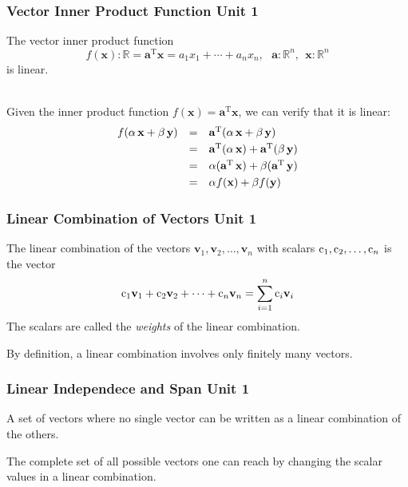 \documentclass[12pt]{beamer}
\newcommand{\FrameTitle}[2]{\frametitle{#1 \hfill \small\textnormal{\textcolor{midgray}{#2}}}}
\newcommand{\ThreePtVspace}{\vspace*{3pt}}
\newcommand{\vsp}{\vspace*{1em}}
\newcommand{\Vector}[1]{\textbf{#1}}
\newcommand{\Scalar}[1]{\textnormal{#1}}
\newcommand{\Quiz}[1]{{\Large\textbf{\color{question}{#1}}}}
\begin{document}
\begin{frame}\FrameTitle{Vector Inner Product Function}{Unit 1}
    The vector inner product function
    \[
        f(\Vector{x}):\mathbb{R} = \Vector{a}^{\textrm{T}} \Vector{x} = a_1x_1 + \cdots + a_nx_n, \ \ \  \Vector{a}: \mathbb{R}^n, \ \ \Vector{x}: \mathbb{R}^n
    \]
    is linear.

    \vsp
    \vsp
    {\Quiz{Proof}}\ThreePtVspace\\
    Given the inner product function $f(\Vector{x}) = \Vector{a}^{\textrm{T}} \Vector{x}$, we can verify that it is linear:
    \[
        \begin{array}{rll}
        f(\alpha \, \Vector{x} + \beta \, \Vector{y}) & = & \Vector{a}^{\textrm{T}} (\alpha \, \Vector{x} + \beta \, \Vector{y}) \ThreePtVspace\\
                                      & = & \Vector{a}^{\textrm{T}} (\alpha \, \Vector{x}) + \Vector{a}^{\textrm{T}} (\beta \, \Vector{y}) \ThreePtVspace\\
                                      & = & \alpha (\Vector{a}^{\textrm{T}} \, \Vector{x}) + \beta (\Vector{a}^{\textrm{T}} \, \Vector{y}) \ThreePtVspace\\
                                      & = & \alpha f(\Vector{x}) + \beta f(\Vector{y})
        \end{array}
    \]
\end{frame}

\begin{frame}\FrameTitle{Linear Combination of Vectors}{Unit 1}
    \begin{definition}
        The linear combination of the vectors
        $\Vector{v}_1, \Vector{v}_2, \ldots, \Vector{v}_n$
        with scalars $\Scalar{c}_1, \Scalar{c}_2, \ldots, \Scalar{c}_n$
        is the vector
        \[
            \Scalar{c}_1 \Vector{v}_1 + \Scalar{c}_2 \Vector{v}_2 +
                \cdots + \Scalar{c}_n \Vector{v}_n =
                \sum_{i=1}^{n} \Scalar{c}_{i} \Vector{v}_{i}
        \]
    The scalars are called the \emph{weights} of the linear combination.

    \vsp
    By definition, a linear combination involves only finitely many vectors.
    \end{definition}
\end{frame}

\begin{frame}\FrameTitle{Linear Independece and Span}{Unit 1}
    \begin{definition}\ThreePtVspace
         A set of vectors where no single vector can be written
         as a linear combination of the others.
    \end{definition}

    \vsp

    \begin{definition}[Span]\ThreePtVspace
        The complete set of all possible  vectors one can reach by
        changing the scalar values in a linear combination.
    \end{definition}
\end{frame}
\end{document}
